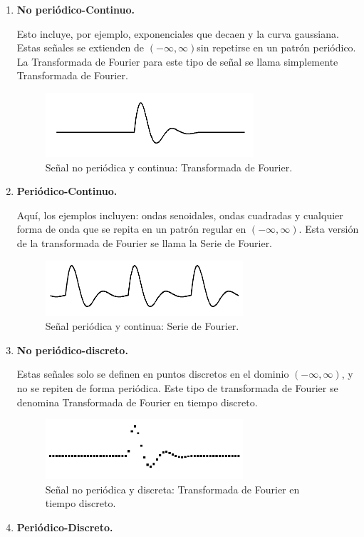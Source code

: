 \begin{enumerate}
\item \textbf{No periódico-Continuo.}

Esto incluye, por ejemplo, exponenciales que decaen y la curva gaussiana. Estas señales se extienden de $(-\infty, \infty)$sin repetirse en un patrón periódico. La Transformada de Fourier para este tipo de señal se llama simplemente Transformada de Fourier.
\begin{figure}[H]
    \centering
    \includegraphics{Imagenes/TDF_01.png}
    \caption{Señal no periódica y continua: Transformada de Fourier.}
    \label{fig:figura_TDF_01}
\end{figure}
\item \textbf{Periódico-Continuo.}

Aquí, los ejemplos incluyen: ondas senoidales, ondas cuadradas y cualquier forma de onda que se repita en un patrón regular en $(-\infty, \infty)$. Esta versión de la transformada de Fourier se llama la Serie de Fourier.
\begin{figure}[H]
    \centering
    \includegraphics{Imagenes/TDF_02.png}
    \caption{Señal periódica y continua: Serie de Fourier.}
    \label{fig:figura_TDF_02}
\end{figure}
\item \textbf{No periódico-discreto.}

Estas señales solo se definen en puntos discretos en el dominio $(-\infty, \infty)$, y no se repiten de forma periódica. Este tipo de transformada de Fourier se denomina Transformada de Fourier en tiempo discreto.
\begin{figure}[H]
    \centering
    \includegraphics{Imagenes/TDF_03.png}
    \caption{Señal no periódica y discreta: Transformada de Fourier en tiempo discreto.}
    \label{fig:figura_TDF_03}
\end{figure}
\item \textbf{Periódico-Discreto.}


\end{enumerate}
